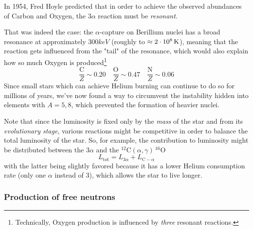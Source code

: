 \par In 1954, Fred Hoyle \cite{1954ApJS....1..121H} predicted that in order to achieve the observed abundances of Carbon and Oxygen, the $3\alpha$ reaction must be \emph{resonant}.
\par That was indeed the case: the $\alpha$-capture on Berillium nuclei has a broad resonance at approximately $300\unit{keV}$ (roughly to $\approx 2\cdot 10^{8}\,\text{K}$), meaning that the reaction gets influenced from the "tail" of the resonance, which would also explain how so much Oxygen is produced\footnote{Technically, Oxygen production is influenced by \emph{three} resonant reactions.}
\begin{equation*}
    \frac{\text{C}}{Z}\sim 0.20\quad\frac{\text{O}}{Z}\sim 0.47\quad \frac{\text{N}}{Z}\sim 0.06
\end{equation*}
Since small stars which can achieve Helium burning can continue to do so for millions of years, we've now found a way to circumvent the instability hidden into elements with $A=5,8$, which prevented the formation of heavier nuclei.
\par Note that since the luminosity is fixed only by the \emph{mass} of the star and from its \emph{evolutionary stage}, various reactions might be competitive in order to balance the total luminosity of the star. So, for example, the contribution to luminosity might be distributed between the $3\alpha$ and the $^{12}\text{C}(\alpha,\gamma)\,^{16}\text{O}$
\begin{equation*}
    L_{\text{tot}} = L_{3\alpha}+L_{\text{C}-\alpha}
\end{equation*}
with the latter being slightly favored because it has a lower Helium consumption rate (only one $\alpha$ instead of 3), which allows the star to live longer.

\subsubsection{Production of free neutrons}

